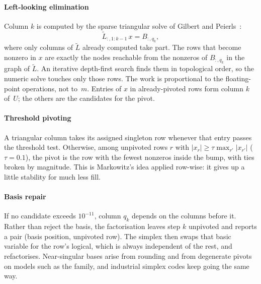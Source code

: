 \paragraph{Left-looking elimination}
Column $k$ is computed by the sparse triangular solve of Gilbert and Peierls~\cite{gilbert1988}:
\begin{equation}\label{eq:gp}
  \tilde L_{:,1:k-1}\, x = B_{:,q_k},
\end{equation}
where only columns of $\tilde L$ already computed take part. The rows that become nonzero in
$x$ are exactly the nodes reachable from the nonzeros of $B_{:,q_k}$ in the graph of $\tilde L$. An
iterative depth-first search finds them in topological order, so the numeric solve touches only
those rows. The work is proportional to the floating-point operations, not to~$m$. Entries of $x$
in already-pivoted rows form column $k$ of~$U$; the others are the candidates for the pivot.

\paragraph{Threshold pivoting}
A triangular column takes its assigned singleton row whenever that entry passes the threshold test.
Otherwise, among unpivoted rows $r$ with $|x_r|\ge\tau\max_{r'}|x_{r'}|$ ($\tau=0.1$), the pivot is
the row with the fewest nonzeros inside the bump, with ties broken by magnitude. This is Markowitz's idea
\cite{markowitz1957} applied row-wise: it gives up a little stability for much less fill.

\paragraph{Basis repair}
If no candidate exceeds $10^{-11}$, column $q_k$ depends on the columns before it. Rather than
reject the basis, the factorisation leaves step $k$ unpivoted and reports a pair (basis position,
unpivoted row). The simplex then swaps that basic variable for the row's logical, which is always
independent of the rest, and refactorises. Near-singular bases arise from rounding and from
degenerate pivots on models such as the  family, and industrial simplex codes keep
going the same way.

